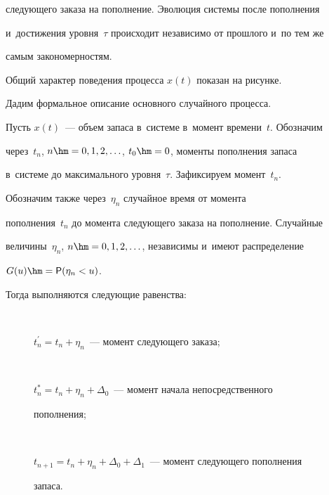 следующего заказа на пополнение. Эволюция системы после пополнения 

и~достижения уровня~$\tau$ происходит независимо от прошлого и~по тем же 

самым закономерностям. 

  

  Общий характер поведения процесса $x(t)$ показан на рисунке.

  

  

  

  Дадим формальное описание основного случайного процесса. 

  

  Пусть $x(t)$~--- объем запаса в~сис\-те\-ме в~момент времени~$t$. Обозначим 

через~$t_n$, $n\hm=0, 1, 2,\ldots$, $t_0\hm=0$, моменты пополнения запаса 

в~системе до максимального уровня~$\tau$. Зафиксируем момент~$t_n$. 

Обозначим также через~$\eta_n$ случайное время от момента 

пополнения~$t_n$ до момента следующего заказа на пополнение. Случайные 

величины~$\eta_n$,  $n\hm=0,1,2,\ldots$, независимы и~имеют распределение 

$G(u)\hm= {\sf P}(\eta_n<u)$.\\[-9pt]

  

  \par

  Тогда выполняются следующие равенства:\\[-9pt]

  

  \noindent

  \begin{description}

\item[\,]  $t_n^\prime=t_n+\eta_n$~---  момент следующего заказа;\\[-9pt]

  

\item[\,]   $t_n^*=t_n+\eta_n+\Delta_0$~--- момент начала непосредственного 

пополнения;\\[-9pt]

  

\item[\,]   $t_{n+1}=t_n+\eta_n+\Delta_0+\Delta_1$~--- момент следующего пополнения 

запаса.\\[-9pt]

\end{description}

